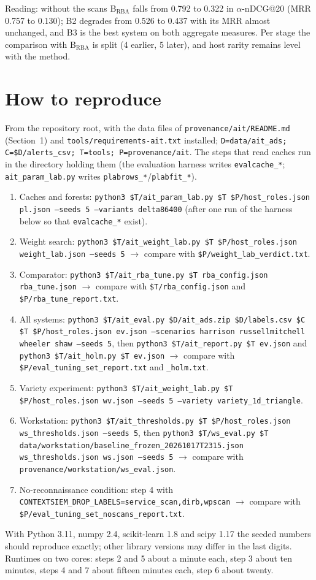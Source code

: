 \documentclass[10.5pt,a4paper]{article}
\begin{document}
\noindent Reading: without the scans B$_\mathrm{RBA}$ falls from 0.792 to 0.322 in $\alpha$-nDCG@20 (MRR 0.757 to 0.130); B2 degrades from 0.526 to 0.437 with its MRR almost unchanged, and B3 is the best system on both aggregate measures. Per stage the comparison with B$_\mathrm{RBA}$ is split (4 earlier, 5 later), and host rarity remains level with the method.

\section{How to reproduce}
\label{sec:repro}
{\raggedright\small
From the repository root, with the data files of \texttt{provenance/ait/README.md} (Section~1) and \texttt{tools/requirements-ait.txt} installed; \texttt{D=data/ait\_ads; C=\$D/alerts\_csv; T=tools; P=provenance/ait}. The steps that read caches run in the directory holding them (the evaluation harness writes \texttt{evalcache\_*}; \texttt{ait\_param\_lab.py} writes \texttt{plabrows\_*}/\texttt{plabfit\_*}).
\begin{enumerate}
\item Caches and forests: \texttt{python3 \$T/ait\_param\_lab.py \$T \$P/host\_roles.json pl.json --seeds 5 --variants delta86400} (after one run of the harness below so that \texttt{evalcache\_*} exist).
\item Weight search: \texttt{python3 \$T/ait\_weight\_lab.py \$T \$P/host\_roles.json weight\_lab.json --seeds 5} $\rightarrow$ compare with \texttt{\$P/weight\_lab\_verdict.txt}.
\item Comparator: \texttt{python3 \$T/ait\_rba\_tune.py \$T rba\_config.json rba\_tune.json} $\rightarrow$ compare with \texttt{\$T/rba\_config.json} and \texttt{\$P/rba\_tune\_report.txt}.
\item All systems: \texttt{python3 \$T/ait\_eval.py \$D/ait\_ads.zip \$D/labels.csv \$C \$T \$P/host\_roles.json ev.json --scenarios harrison russellmitchell wheeler shaw --seeds 5}, then \texttt{python3 \$T/ait\_report.py \$T ev.json} and \texttt{python3 \$T/ait\_holm.py \$T ev.json} $\rightarrow$ compare with \texttt{\$P/eval\_tuning\_set\_report.txt} and \texttt{\_holm.txt}.
\item Variety experiment: \texttt{python3 \$T/ait\_weight\_lab.py \$T \$P/host\_roles.json wv.json --seeds 5 --variety variety\_1d\_triangle}.
\item Workstation: \texttt{python3 \$T/ait\_thresholds.py \$T \$P/host\_roles.json ws\_thresholds.json --seeds 5}, then \texttt{python3 \$T/ws\_eval.py \$T data/workstation/baseline\_frozen\_20261017T2315.json ws\_thresholds.json ws.json --seeds 5} $\rightarrow$ compare with \texttt{provenance/workstation/ws\_eval.json}.
\item No-reconnaissance condition: step 4 with \texttt{CONTEXTSIEM\_DROP\_LABELS=service\_scan,dirb,wpscan} $\rightarrow$ compare with \texttt{\$P/eval\_tuning\_set\_noscans\_report.txt}.
\end{enumerate}
With Python 3.11, numpy 2.4, scikit-learn 1.8 and scipy 1.17 the seeded numbers should reproduce exactly; other library versions may differ in the last digits. Runtimes on two cores: steps 2 and 5 about a minute each, step 3 about ten minutes, steps 4 and 7 about fifteen minutes each, step 6 about twenty.\par}
\end{document}

